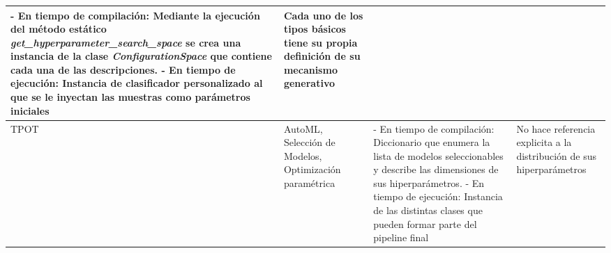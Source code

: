 \begin{longtable}{  p{2.5cm}  p{4cm}  p{6.8cm}  p{6.5cm} }
    - En tiempo de compilación: Mediante la ejecución del método estático {\it get\_hyperparameter\_search\_space} se crea una instancia de la clase  {\it ConfigurationSpace} que contiene cada una de las descripciones. \newline- En tiempo de ejecución: Instancia de clasificador personalizado al que se le inyectan las muestras como parámetros iniciales &
    Cada uno de los tipos básicos tiene su propia definición de su mecanismo generativo                                                                                                                                                                                                                                                                             \\
    \hline
    TPOT                                                                                                                                                                                                                                                                                                                                                          &
    AutoML, Selección de Modelos, Optimización paramétrica                                                                                                                                                                                                                                                                                                        &
    - En tiempo de compilación: Diccionario que enumera la lista de modelos seleccionables y describe las dimensiones de sus hiperparámetros. \newline- En tiempo de ejecución: Instancia de las distintas clases que pueden formar parte del pipeline final                                                                                                      &
    No hace referencia explicita a la distribución de sus hiperparámetros                                                                                                                                                                                                                                                                                           \\

\end{longtable}
